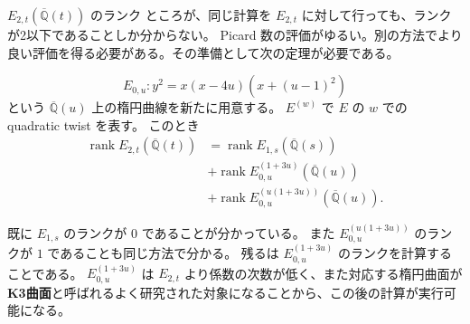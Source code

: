 \documentclass{classes/mybeamer}
\DeclareMathOperator{\rank}{rank}
\begin{document}
\begin{frame}{$E_{2,t}(\overline{\mathbb{Q}}(t))$ のランク}
    ところが、同じ計算を $E_{2,t}$ に対して行っても、ランクが2以下であることしか分からない。
    Picard 数の評価がゆるい。別の方法でより良い評価を得る必要がある。その準備として次の定理が必要である。
    \begin{thm}[Y.]
        \begin{equation*}
            E_{0,u}: y^{2} = x(x - 4u)(x + (u - 1)^{2})
        \end{equation*}
        という $\overline{\mathbb{Q}}(u)$ 上の楕円曲線を新たに用意する。
        $E^{(w)}$ で $E$ の $w$ での quadratic twist を表す。
        このとき
        \begin{equation}
            \label{eq:rankdecomposition}
            \begin{split}
                \rank E_{2,t}(\overline{\mathbb{Q}}(t)) & = \rank E_{1,s}(\overline{\mathbb{Q}}(s))                \\
                                                        & + \rank E_{0,u}^{(1 + 3u)}(\overline{\mathbb{Q}}(u))     \\
                                                        & + \rank E_{0,u}^{(u(1 + 3u))}(\overline{\mathbb{Q}}(u)).
            \end{split}
        \end{equation}
    \end{thm}
    既に $E_{1,s}$ のランクが $0$ であることが分かっている。
    また $E_{0,u}^{(u(1 + 3u))}$ のランクが $1$ であることも同じ方法で分かる。
    残るは $E_{0,u}^{(1 + 3u)}$ のランクを計算することである。
    $E_{0,u}^{(1 + 3u)}$ は $E_{2,t}$ より係数の次数が低く、また対応する楕円曲面が\textbf{K3曲面}と呼ばれるよく研究された対象になることから、この後の計算が実行可能になる。
\end{frame}
\end{document}
